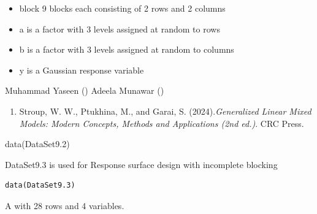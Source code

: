 \documentclass[a4paper]{book}
\begin{document}
\begin{Details}
\begin{itemize}

\item{} block  9 blocks each consisting of 2 rows and 2 columns
\item{} a      is a factor with 3 levels assigned at random to rows
\item{} b      is a factor with 3 levels assigned at random to columns
\item{} y      is a Gaussian response variable

\end{itemize}

\end{Details}
%
\begin{Author}
Muhammad Yaseen ()
Adeela Munawar ()
\end{Author}
%
\begin{References}
\begin{enumerate}

\item{} Stroup, W. W., Ptukhina, M., and Garai, S. (2024).\emph{Generalized Linear Mixed Models: Modern Concepts, Methods and Applications (2nd ed.)}.
CRC Press.

\end{enumerate}

\end{References}
%
\begin{SeeAlso}
\end{SeeAlso}
%
\begin{Examples}
\begin{ExampleCode}
data(DataSet9.2)
\end{ExampleCode}
\end{Examples}
%
\begin{Description}
DataSet9.3 is used for Response surface design with incomplete blocking
\end{Description}
%
\begin{Usage}
\begin{verbatim}
data(DataSet9.3)
\end{verbatim}
\end{Usage}
%
\begin{Format}
A  with 28 rows and 4 variables.
\end{Format}
\end{document}
